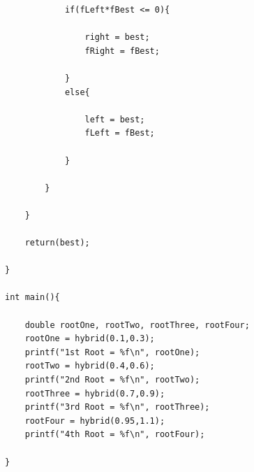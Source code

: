 \documentclass[12pt]{article}
\begin{document}
\begin{verbatim}
			if(fLeft*fBest <= 0){

				right = best;
				fRight = fBest;

			}
			else{

				left = best;
				fLeft = fBest;

			}

		}

	}

	return(best);

}

int main(){

	double rootOne, rootTwo, rootThree, rootFour;
	rootOne = hybrid(0.1,0.3);
	printf("1st Root = %f\n", rootOne);
	rootTwo = hybrid(0.4,0.6);
	printf("2nd Root = %f\n", rootTwo);
	rootThree = hybrid(0.7,0.9);
	printf("3rd Root = %f\n", rootThree);
	rootFour = hybrid(0.95,1.1);
	printf("4th Root = %f\n", rootFour);

}
\end{verbatim}
\end{document}
